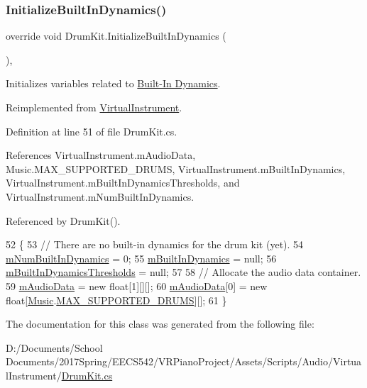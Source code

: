\subsubsection{\texorpdfstring{Initialize\+Built\+In\+Dynamics()}{InitializeBuiltInDynamics()}}
{\footnotesize\ttfamily override void Drum\+Kit.\+Initialize\+Built\+In\+Dynamics (\begin{DoxyParamCaption}{ }\end{DoxyParamCaption})\hspace{0.3cm}{\ttfamily [protected]}, {\ttfamily [virtual]}}



Initializes variables related to \hyperlink{group___audio_DefBID}{Built-\/\+In Dynamics}. 



Reimplemented from \hyperlink{group___v_i_base_virt_func_ga995456c03ee54543b285188c51c29a07}{Virtual\+Instrument}.



Definition at line 51 of file Drum\+Kit.\+cs.



References Virtual\+Instrument.\+m\+Audio\+Data, Music.\+M\+A\+X\+\_\+\+S\+U\+P\+P\+O\+R\+T\+E\+D\+\_\+\+D\+R\+U\+MS, Virtual\+Instrument.\+m\+Built\+In\+Dynamics, Virtual\+Instrument.\+m\+Built\+In\+Dynamics\+Thresholds, and Virtual\+Instrument.\+m\+Num\+Built\+In\+Dynamics.



Referenced by Drum\+Kit().


\begin{DoxyCode}
52     \{
53         \textcolor{comment}{// There are no built-in dynamics for the drum kit (yet).}
54         \hyperlink{group___v_i_base_pro_var_gac265f64f759d267ee1e1680f8d387011}{mNumBuiltInDynamics} = 0;
55         \hyperlink{group___v_i_base_pro_var_ga87961e72f25fbc2256b614a394aa6f13}{mBuiltInDynamics} = null;
56         \hyperlink{group___v_i_base_pro_var_gae3db4264dc2a96e99ea680c6d637e6bf}{mBuiltInDynamicsThresholds} = null;
57 
58         \textcolor{comment}{// Allocate the audio data container.}
59         \hyperlink{group___v_i_base_pro_var_ga52e76d9b74408660584676035a92a2c6}{mAudioData} = \textcolor{keyword}{new} \textcolor{keywordtype}{float}[1][][];
60         \hyperlink{group___v_i_base_pro_var_ga52e76d9b74408660584676035a92a2c6}{mAudioData}[0] = \textcolor{keyword}{new} \textcolor{keywordtype}{float}[\hyperlink{class_music}{Music}.\hyperlink{group___music_constants_gabce1a1ac5b9b6355af6bd7fb3868467a}{MAX\_SUPPORTED\_DRUMS}][];
61     \}
\end{DoxyCode}


The documentation for this class was generated from the following file\+:\begin{DoxyCompactItemize}
\item 
D\+:/\+Documents/\+School Documents/2017\+Spring/\+E\+E\+C\+S542/\+V\+R\+Piano\+Project/\+Assets/\+Scripts/\+Audio/\+Virtual\+Instrument/\hyperlink{_drum_kit_8cs}{Drum\+Kit.\+cs}\end{DoxyCompactItemize}
